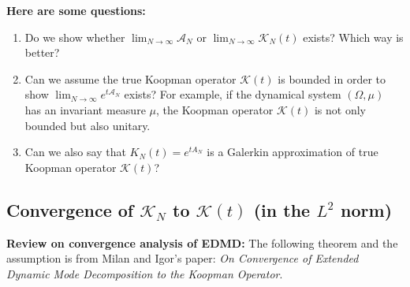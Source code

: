 \documentclass{article}[11]
\begin{document}
	\noindent\textbf{Here are some questions:}
	\begin{enumerate}
		\item Do we show whether $\lim_{N\to\infty}\mathcal{A}_N$ or $\lim_{N\to\infty}\mathcal{K}_{N}(t)$ exists? Which way is better?
		
		\item Can we assume the true Koopman operator $\mathcal{K}(t)$ is bounded in order to show $\lim_{N\to\infty}e^{t \mathcal{A}_N}$ exists? For example, if the dynamical system $(\Omega, \mu)$ has an invariant measure $\mu$, the Koopman operator $\mathcal{K}(t)$ is not only bounded but also unitary.
		
		\item Can we also say that $K_{N}(t) = e^{t A_N}$ is a Galerkin approximation of true Koopman operator $\mathcal{K}(t)$?
	\end{enumerate}
	
	\subsection{Convergence of \(\mathcal{K}_N\) to \(\mathcal{K}(t)\) (in the \(L^2\) norm)}
	\textbf{Review on convergence analysis of EDMD: }
	The following theorem and the assumption is from Milan and Igor's paper: \textit{On Convergence of Extended Dynamic Mode Decomposition to the Koopman Operator}.
	
\end{document}
